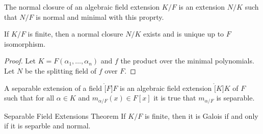 \documentclass{article}                                                        %
\begin{document}
        \begin{definition}
            The normal closure of an algebraic field extension $K/F$ is an
            extension $N/K$ such that $N/F$ is normal and minimal with this
            proprty.
        \end{definition}
        \begin{theorem}
            If $K/F$ is finite, then a normal closure $N/K$ exists and is unique
            up to $F$ isomorphism.
        \end{theorem}
        \begin{proof}
            Let $K=F(\alpha_{1},\dots,\alpha_{n})$ and $f$ the product over the
            minimal polynomials. Let $N$ be the splitting field of $f$ over $F$.
        \end{proof}
        \begin{definition}
            A separable extension of a field $\ring[F]{F}$ is an algebraic field
            extension $\ring[K]{K}$ of $F$ such that for all $\alpha\in{K}$ and
            $m_{\alpha/F}(x)\in{F}[x]$ it is true that $m_{\alpha/F}$ is
            separable.
        \end{definition}
        \begin{ftheorem}{Separable Field Extensions Theorem}{}
            If $K/F$ is finite, then it is Galois if and only if it is separble
            and normal.
        \end{ftheorem}
\end{document}
